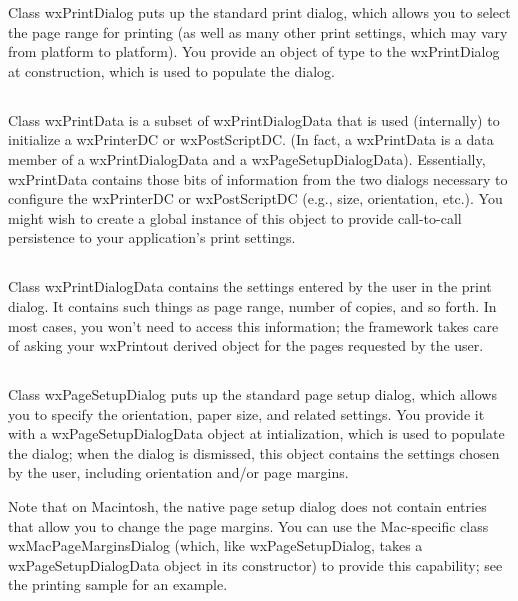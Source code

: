 Class wxPrintDialog puts up the standard print dialog, which allows you to
select the page range for printing (as well as many other print settings, which
may vary from platform to platform). You provide an object of type
 to the wxPrintDialog at
construction, which is used to populate the dialog.

\subsection{}

Class wxPrintData is a subset of wxPrintDialogData that is used (internally) to
initialize a wxPrinterDC or wxPostScriptDC. (In fact, a wxPrintData is a data
member of a wxPrintDialogData and a wxPageSetupDialogData). Essentially,
wxPrintData contains those bits of information from the two dialogs necessary to
configure the wxPrinterDC or wxPostScriptDC (e.g., size, orientation, etc.). You
might wish to create a global instance of this object to provide call-to-call
persistence to your application's print settings.

\subsection{}

Class wxPrintDialogData contains the settings entered by the user in the print
dialog. It contains such things as page range, number of copies, and so forth.
In most cases, you won't need to access this information; the framework takes
care of asking your wxPrintout derived object for the pages requested by the
user.

\subsection{}

Class wxPageSetupDialog puts up the standard page setup dialog, which allows you
to specify the orientation, paper size, and related settings. You provide it
with a wxPageSetupDialogData object at intialization, which is used to populate
the dialog; when the dialog is dismissed, this object contains the settings
chosen by the user, including orientation and/or page margins.

Note that on Macintosh, the native page setup dialog does not contain entries
that allow you to change the page margins. You can use the Mac-specific class
wxMacPageMarginsDialog (which, like wxPageSetupDialog, takes a
wxPageSetupDialogData object in its constructor) to provide this capability; see
the printing sample for an example.

